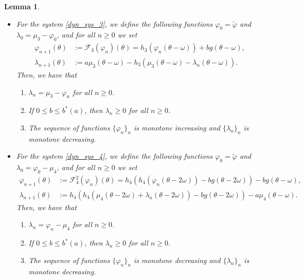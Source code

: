 \documentclass[12pt]{article}
\theoremstyle{plain}
\newtheorem{lemma}[defn]{Lemma}
\theoremstyle{remark}
\theoremstyle{definition}
\begin{document}
\begin{lemma}
\begin{itemize}
        \begin{enumerate}
            \item $\lambda_n = \mu_2-\varphi_n$ for all $n\geq0$.
            \item If $0\leq b\leq b^*(a)$, then $\lambda_n\geq 0$ for all $n\geq0$.
            \item The sequence of functions $\{\varphi_n\}_n$ is monotone increasing and $\{\lambda_n\}_n$ is monotone decreasing.
        \end{enumerate}
        \item For the system \eqref{dyn_sys_3}, we define the following functions $\varphi_0=\tilde\varphi$ and $\lambda_0 = \mu_3-\varphi_0$, and for all $n\geq0$ we set
        \begin{align*}
            \varphi_{n+1}(\theta) &:= \mathcal{F}_3(\varphi_n)(\theta) = h_{3}(\varphi_n(\theta-\omega)) + b g(\theta-\omega),\\
            \lambda_{n+1}(\theta) &:= a\mu_3(\theta-\omega) - h_{3}(\mu_3(\theta-\omega)-\lambda_n(\theta-\omega)).
        \end{align*}
        Then, we have that
        \begin{enumerate}
            \item $\lambda_n = \mu_3-\varphi_n$ for all $n\geq0$.
            \item If $0\leq b\leq b^*(a)$, then $\lambda_n\geq 0$ for all $n\geq0$.
            \item The sequence of functions $\{\varphi_n\}_n$ is monotone increasing and $\{\lambda_n\}_n$ is monotone decreasing.
        \end{enumerate}
        \item For the system \eqref{dyn_sys_4}, we define the following functions $\varphi_0=\tilde\varphi$ and $\lambda_0 = \varphi_0-\mu_4$, and for all $n\geq0$ we set
        \begin{align*}
            \varphi_{n+1}(\theta) &:= \mathcal{F}_4^2(\varphi_n)(\theta) = h_4(h_{4}(\varphi_n(\theta-2\omega)) - b g(\theta-2\omega)) - b g(\theta-\omega),\\
            \lambda_{n+1}(\theta) &:= h_4(h_{4}(\mu_4(\theta-2\omega)+\lambda_n(\theta-2\omega)) - b g(\theta-2\omega)) - a\mu_4(\theta-\omega).
        \end{align*}
        Then, we have that
        \begin{enumerate}
            \item $\lambda_n = \varphi_n-\mu_4$ for all $n\geq0$.
            \item If $0\leq b\leq b^*(a)$, then $\lambda_n\geq 0$ for all $n\geq0$.
            \item The sequence of functions $\{\varphi_n\}_n$ is monotone decreasing and $\{\lambda_n\}_n$ is monotone decreasing.
        \end{enumerate}
    \end{itemize}
\end{lemma}
\end{document}

